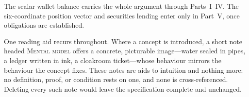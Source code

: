 The scalar wallet balance carries the whole argument through Parts~I--IV. The
six-coordinate position vector and securities lending enter only in Part~V, once
obligations are established.

One reading aid recurs throughout. Where a concept is introduced, a short note headed
\textsc{Mental model} offers a concrete, picturable image---water sealed in pipes, a
ledger written in ink, a cloakroom ticket---whose behaviour mirrors the behaviour the
concept fixes. These notes are aids to intuition and nothing more: no definition, proof,
or condition rests on one, and none is cross-referenced. Deleting every such note would
leave the specification complete and unchanged.

\clearpage

